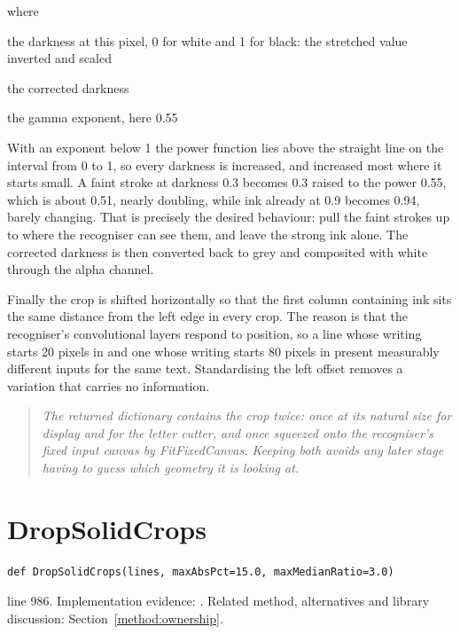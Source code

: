 \noindent where
\begin{description}[leftmargin=2.4em,style=nextline,font=\normalfont\ttfamily]\setlength\itemsep{1pt}
  \item[{$d[y,x]$}] \normalfont the darkness at this pixel, 0 for white and 1 for black: the stretched value inverted and scaled
  \item[{$d'[y,x]$}] \normalfont the corrected darkness
  \item[{$\gamma$}] \normalfont the gamma exponent, here 0.55
\end{description}
With an exponent below 1 the power function lies above the straight line on the interval from 0 to 1, so every darkness is increased, and increased most where it starts small. A faint stroke at darkness 0.3 becomes 0.3 raised to the power 0.55, which is about 0.51, nearly doubling, while ink already at 0.9 becomes 0.94, barely changing. That is precisely the desired behaviour: pull the faint strokes up to where the recogniser can see them, and leave the strong ink alone. The corrected darkness is then converted back to grey and composited with white through the alpha channel.


Finally the crop is shifted horizontally so that the first column containing ink sits the same distance from the left edge in every crop. The reason is that the recogniser's convolutional layers respond to position, so a line whose writing starts 20 pixels in and one whose writing starts 80 pixels in present measurably different inputs for the same text. Standardising the left offset removes a variation that carries no information.


\begin{quote}\small\itshape The returned dictionary contains the crop twice: once at its natural size for display and for the letter cutter, and once squeezed onto the recogniser's fixed input canvas by FitFixedCanvas. Keeping both avoids any later stage having to guess which geometry it is looking at.\end{quote}


\section{DropSolidCrops}\label{fn:segment:DropSolidCrops}
\begin{lstlisting}[style=sig]
def DropSolidCrops(lines, maxAbsPct=15.0, maxMedianRatio=3.0)
\end{lstlisting}
 line 986. Implementation evidence: \cite{code2026}. Related method, alternatives and library discussion: Section~\ref{method:ownership}.


